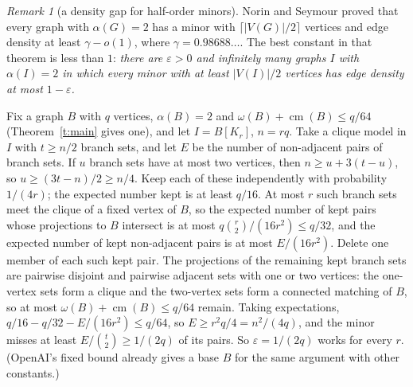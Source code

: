 \documentclass[11pt]{article}
\theoremstyle{definition}\newtheorem{conjecture}[theorem]{Conjecture}
\theoremstyle{remark}\newtheorem{remark}[theorem]{Remark}
\newcommand{\cm}{\operatorname{cm}}
\newcommand{\eps}{\varepsilon}
\begin{document}
\begin{remark}[a density gap for half-order minors]\label{r:dense}
Norin and Seymour \cite{NS} proved that every graph with $\alpha(G)=2$ has a minor with $\lceil|V(G)|/2\rceil$ vertices and edge
density at least $\gamma-o(1)$, where $\gamma=0.98688\ldots$. The best constant in that theorem is less than $1$:
\emph{there are $\eps>0$ and infinitely many graphs $I$ with $\alpha(I)=2$ in which every minor with at least $|V(I)|/2$
vertices has edge density at most $1-\eps$.}

Fix a graph $B$ with $q$ vertices, $\alpha(B)=2$ and $\omega(B)+\cm(B)\le q/64$ (Theorem~\ref{t:main} gives one), and let
$I=B[K_r]$, $n=rq$. Take a clique model in $I$ with $t\ge n/2$ branch sets, and let $E$ be the number of non-adjacent pairs of
branch sets. If $u$ branch sets have at most two vertices, then $n\ge u+3(t-u)$, so $u\ge(3t-n)/2\ge n/4$. Keep each of these independently with
probability $1/(4r)$; the expected number kept is at least $q/16$. At most $r$ such branch sets meet the clique of a fixed
vertex of $B$, so the expected number of kept pairs whose projections to $B$ intersect is at most $q\binom r2/(16r^2)\le q/32$,
and the expected number of kept non-adjacent pairs is at most $E/(16r^2)$. Delete one member of each such kept pair. The
projections of the remaining kept branch sets are pairwise disjoint and pairwise adjacent sets with one or two vertices: the
one-vertex sets form a clique and the two-vertex sets form a connected matching of $B$, so at most $\omega(B)+\cm(B)\le q/64$
remain. Taking expectations, $q/16-q/32-E/(16r^2)\le q/64$, so $E\ge r^2q/4=n^2/(4q)$, and the minor misses at least
$E/\binom t2\ge1/(2q)$ of its pairs. So $\eps=1/(2q)$ works for every $r$. (OpenAI's fixed bound already gives a base $B$ for
the same argument with other constants.)
\end{remark}
\end{document}
